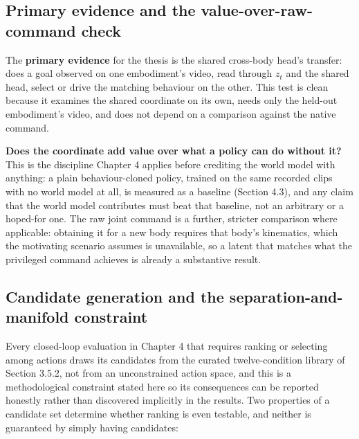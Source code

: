 \documentclass[12pt,a4paper,oneside]{report}
\begin{document}
\subsection{Primary evidence and the value-over-raw-command check}
The \textbf{primary evidence} for the thesis is the shared cross-body head's transfer: does a goal observed on
one embodiment's video, read through $z_t$ and the shared head, select or drive the matching behaviour on the
other. This test is clean because it examines the shared coordinate on its own, needs only the held-out
embodiment's video, and does not depend on a comparison against the native command.

\noindent\textbf{Does the coordinate add value over what a policy can do without it?} This is the discipline
Chapter 4 applies before crediting the world model with anything: a plain behaviour-cloned policy, trained on the
same recorded clips with no world model at all, is measured as a baseline (Section 4.3), and any claim that the
world model contributes must beat that baseline, not an arbitrary or a hoped-for one. The raw joint command is a
further, stricter comparison where applicable: obtaining it for a new body requires that body's kinematics, which
the motivating scenario assumes is unavailable, so a latent that matches what the privileged command achieves is
already a substantive result.

\subsection{Candidate generation and the separation-and-manifold constraint}
Every closed-loop evaluation in Chapter 4 that requires ranking or selecting among actions draws its candidates
from the curated twelve-condition library of Section 3.5.2, not from an unconstrained action space, and this is a
methodological constraint stated here so its consequences can be reported honestly rather than discovered
implicitly in the results. Two properties of a candidate set determine whether ranking is even testable, and
neither is guaranteed by simply having candidates:
\end{document}

